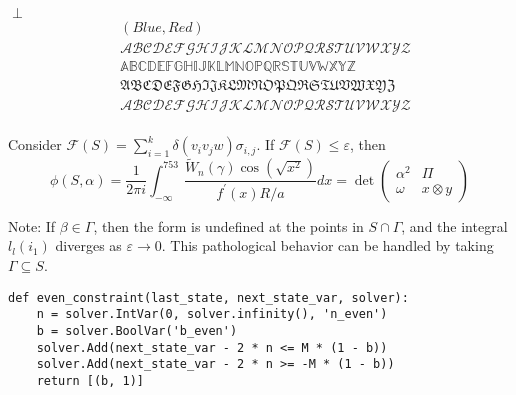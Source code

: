 \begin{center}
    $\perp$ 
    \begin{equation}
        \begin{split}
        &(\mathit{Blue}, \mathit{Red})\\
        &\mathcal{ABCDEFGHIJKLMNOPQRSTUVWXYZ}\\
        &\mathbb{ABCDEFGHIJKLMNOPQRSTUVWXYZ}\\
        &\mathfrak{ABCDEFGHIJKLMNOPQRSTUVWXYZ}\\
        &\mathscr{ABCDEFGHIJKLMNOPQRSTUVWXYZ}\\
        \end{split}
    \end{equation}
\end{center}
Consider $\mathcal{F}(S)=\sum_{i=1}^k \delta\left(v_i v_j w\right) \sigma_{i, j}$.
If $\mathcal{F}(S) \leq \varepsilon$, then
$$
\phi(S, \alpha)=\frac{1}{2 \pi i} \int_{-\infty}^{753} \frac{\tilde{W}_n(\gamma) \cos \left(\sqrt{x^2}\right)}{f^{\prime}(x) R / a} d x=\operatorname{det}\left(\begin{array}{cc}
\alpha^2 & \Pi \\
\omega & x \otimes y
\end{array}\right)
$$


Note: If $\beta \in \Gamma$, then the form is undefined at the points in $S \cap \Gamma$, and the integral $l_l\left(i_1\right)$ diverges as $\varepsilon \rightarrow 0$. This pathological behavior can be handled by taking $\Gamma \subseteq S$.


{
  \small
\begin{verbatim}
def even_constraint(last_state, next_state_var, solver):
    n = solver.IntVar(0, solver.infinity(), 'n_even')
    b = solver.BoolVar('b_even')
    solver.Add(next_state_var - 2 * n <= M * (1 - b))
    solver.Add(next_state_var - 2 * n >= -M * (1 - b))
    return [(b, 1)]
\end{verbatim}
}

